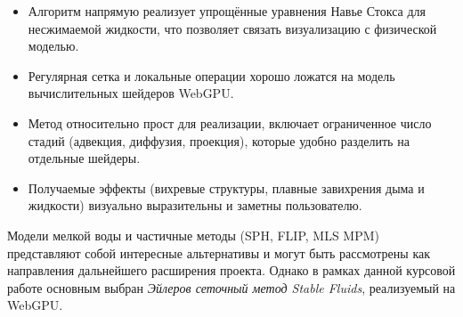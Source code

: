 \begin{itemize}
      \item Алгоритм напрямую реализует упрощённые
            уравнения Навье Стокса для несжимаемой жидкости,
            что позволяет связать визуализацию с физической
            моделью.
      \item Регулярная сетка и локальные операции хорошо
            ложатся на модель вычислительных шейдеров WebGPU.
      \item Метод относительно прост для реализации,
            включает ограниченное число стадий (адвекция,
            диффузия, проекция), которые удобно разделить на
            отдельные шейдеры.
      \item Получаемые эффекты (вихревые структуры, плавные
            завихрения дыма и жидкости) визуально выразительны
            и заметны пользователю.
\end{itemize}

Модели мелкой воды и частичные методы (SPH, FLIP,
MLS \textemdash{}MPM) представляют собой интересные альтернативы
и могут быть рассмотрены как направления дальнейшего
расширения проекта. Однако в рамках данной курсовой
работе основным выбран \emph{Эйлеров сеточный метод
      Stable Fluids}, реализуемый на WebGPU.
